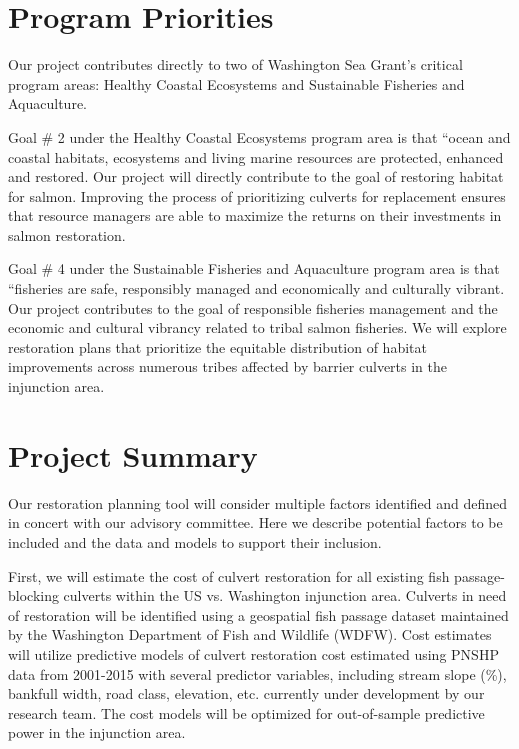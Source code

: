 \documentclass[12pt]{elsarticle}
\begin{document}
\section{Program Priorities} %


Our project contributes directly to two of Washington Sea Grant's critical program areas: Healthy Coastal Ecosystems and Sustainable Fisheries and Aquaculture. 

Goal \# 2 under the Healthy Coastal Ecosystems program area is that ``ocean and coastal habitats, ecosystems and living marine resources are protected, enhanced and restored. Our project will directly contribute to the goal of restoring habitat for salmon. Improving the process of prioritizing culverts for replacement ensures that resource managers are able to maximize the returns on their investments in salmon restoration.

Goal \# 4 under the Sustainable Fisheries and Aquaculture program area is that ``fisheries are safe, responsibly managed and economically and culturally vibrant. Our project contributes to the goal of responsible fisheries management and the economic and cultural vibrancy related to tribal salmon fisheries. We will explore restoration plans that prioritize the equitable distribution of habitat improvements across numerous tribes affected by barrier culverts in the injunction area. 

\section{Project Summary} %

Our restoration planning tool will consider multiple factors identified and defined in concert with our advisory committee. Here we describe potential factors to be included and the data and models to support their inclusion.   

First, we will estimate the cost of culvert restoration for all existing fish passage-blocking culverts within the US vs. Washington injunction area. Culverts in need of restoration will be identified using a geospatial fish passage dataset maintained by the Washington Department of Fish and Wildlife (WDFW). Cost estimates will utilize predictive models of culvert restoration cost estimated using PNSHP data from 2001-2015 with several predictor variables, including stream slope (\%), bankfull width, road class, elevation, etc. currently under development by our research team. The cost models will be optimized for out-of-sample predictive power in the injunction area.
\end{document}
